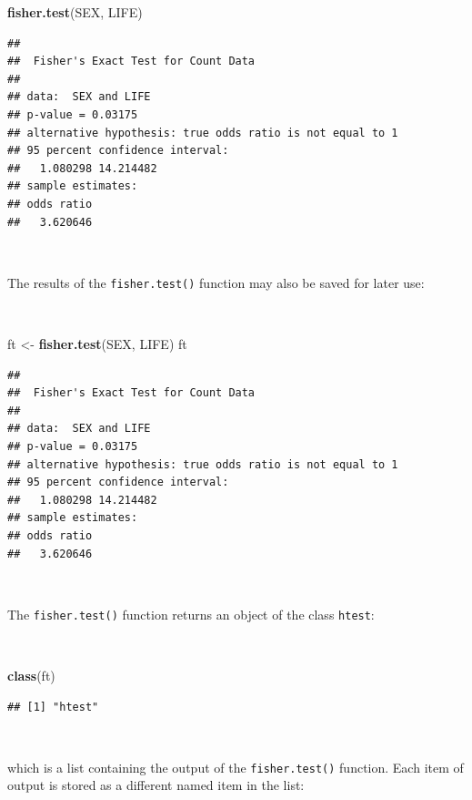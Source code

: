 \documentclass[12pt,a4paper]{book}
\newenvironment{Shaded}{\begin{snugshade}}{\end{snugshade}}
\newcommand{\KeywordTok}[1]{\textcolor[rgb]{0.13,0.29,0.53}{\textbf{#1}}}
\newcommand{\StringTok}[1]{\textcolor[rgb]{0.31,0.60,0.02}{#1}}
\newcommand{\NormalTok}[1]{#1}
\theoremstyle{definition}
\theoremstyle{definition}
\theoremstyle{definition}
\theoremstyle{remark}
\begin{document}
\begin{Shaded}
\begin{Highlighting}[]
\KeywordTok{fisher.test}\NormalTok{(SEX, LIFE)}
\end{Highlighting}
\end{Shaded}

\begin{verbatim}
## 
##  Fisher's Exact Test for Count Data
## 
## data:  SEX and LIFE
## p-value = 0.03175
## alternative hypothesis: true odds ratio is not equal to 1
## 95 percent confidence interval:
##   1.080298 14.214482
## sample estimates:
## odds ratio 
##   3.620646
\end{verbatim}

~

The results of the \texttt{fisher.test()} function may also be saved for
later use:

~

\begin{Shaded}
\begin{Highlighting}[]
\NormalTok{ft <-}\StringTok{ }\KeywordTok{fisher.test}\NormalTok{(SEX, LIFE)}
\NormalTok{ft}
\end{Highlighting}
\end{Shaded}

\begin{verbatim}
## 
##  Fisher's Exact Test for Count Data
## 
## data:  SEX and LIFE
## p-value = 0.03175
## alternative hypothesis: true odds ratio is not equal to 1
## 95 percent confidence interval:
##   1.080298 14.214482
## sample estimates:
## odds ratio 
##   3.620646
\end{verbatim}

~

The \texttt{fisher.test()} function returns an object of the class
\texttt{htest}:

~

\begin{Shaded}
\begin{Highlighting}[]
\KeywordTok{class}\NormalTok{(ft)}
\end{Highlighting}
\end{Shaded}

\begin{verbatim}
## [1] "htest"
\end{verbatim}

~

which is a list containing the output of the \texttt{fisher.test()}
function. Each item of output is stored as a different named item in the
list:
\end{document}
